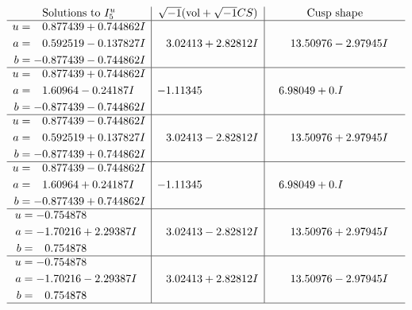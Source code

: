 \documentclass[1p]{elsarticle_modified}
\theoremstyle{definition}
\newcommand{\I}{\sqrt{-1}}
\begin{document}
$$\begin{array}{c|c|c}  
\text{Solutions to }I^u_{5}& \I (\text{vol} + \sqrt{-1}CS) & \text{Cusp shape}\\
 \hline 
\begin{aligned}
u &= \phantom{-}0.877439 + 0.744862 I \\
a &= \phantom{-}0.592519 - 0.137827 I \\
b &= -0.877439 - 0.744862 I\end{aligned}
 & \phantom{-}3.02413 + 2.82812 I & \phantom{-}13.50976 - 2.97945 I \\ \hline\begin{aligned}
u &= \phantom{-}0.877439 + 0.744862 I \\
a &= \phantom{-}1.60964 - 0.24187 I \\
b &= -0.877439 - 0.744862 I\end{aligned}
 & -1.11345\phantom{ +0.000000I} & \phantom{-}6.98049 + 0. I\phantom{ +0.000000I} \\ \hline\begin{aligned}
u &= \phantom{-}0.877439 - 0.744862 I \\
a &= \phantom{-}0.592519 + 0.137827 I \\
b &= -0.877439 + 0.744862 I\end{aligned}
 & \phantom{-}3.02413 - 2.82812 I & \phantom{-}13.50976 + 2.97945 I \\ \hline\begin{aligned}
u &= \phantom{-}0.877439 - 0.744862 I \\
a &= \phantom{-}1.60964 + 0.24187 I \\
b &= -0.877439 + 0.744862 I\end{aligned}
 & -1.11345\phantom{ +0.000000I} & \phantom{-}6.98049 + 0. I\phantom{ +0.000000I} \\ \hline\begin{aligned}
u &= -0.754878\phantom{ +0.000000I} \\
a &= -1.70216 + 2.29387 I \\
b &= \phantom{-}0.754878\phantom{ +0.000000I}\end{aligned}
 & \phantom{-}3.02413 - 2.82812 I & \phantom{-}13.50976 + 2.97945 I \\ \hline\begin{aligned}
u &= -0.754878\phantom{ +0.000000I} \\
a &= -1.70216 - 2.29387 I \\
b &= \phantom{-}0.754878\phantom{ +0.000000I}\end{aligned}
 & \phantom{-}3.02413 + 2.82812 I & \phantom{-}13.50976 - 2.97945 I\\
 \hline 
 \end{array}$$\newpage\newpage\renewcommand{\arraystretch}{1}
\end{document}
